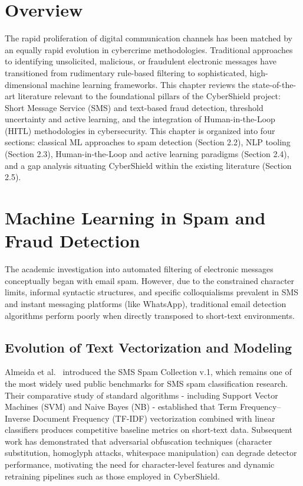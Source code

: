 \section{Overview}
The rapid proliferation of digital communication channels has been matched by an equally rapid evolution in cybercrime methodologies. Traditional approaches to identifying unsolicited, malicious, or fraudulent electronic messages have transitioned from rudimentary rule-based filtering to sophisticated, high-dimensional machine learning frameworks. This chapter reviews the state-of-the-art literature relevant to the foundational pillars of the CyberShield project: Short Message Service (SMS) and text-based fraud detection, threshold uncertainty and active learning, and the integration of Human-in-the-Loop (HITL) methodologies in cybersecurity. This chapter is organized into four sections: classical ML approaches to spam detection (Section 2.2), NLP tooling (Section 2.3), Human-in-the-Loop and active learning paradigms (Section 2.4), and a gap analysis situating CyberShield within the existing literature (Section 2.5).

\section{Machine Learning in Spam and Fraud Detection}
The academic investigation into automated filtering of electronic messages conceptually began with email spam. However, due to the constrained character limits, informal syntactic structures, and specific colloquialisms prevalent in SMS and instant messaging platforms (like WhatsApp), traditional email detection algorithms perform poorly when directly transposed to short-text environments.

\subsection{Evolution of Text Vectorization and Modeling}
Almeida et al.~\cite{almeida2011contributions} introduced the SMS Spam Collection v.1, which remains one of the most widely used public benchmarks for SMS spam classification research. Their comparative study of standard algorithms - including Support Vector Machines (SVM) and Naive Bayes (NB) - established that Term Frequency–Inverse Document Frequency (TF-IDF) vectorization combined with linear classifiers produces competitive baseline metrics on short-text data. Subsequent work has demonstrated that adversarial obfuscation techniques (character substitution, homoglyph attacks, whitespace manipulation) can degrade detector performance, motivating the need for character-level features and dynamic retraining pipelines such as those employed in CyberShield.

